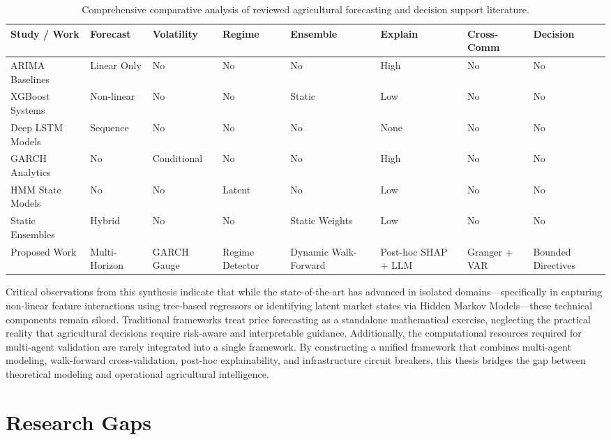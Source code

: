 \documentclass[12pt,a4paper]{report}
\theoremstyle{definition}
\theoremstyle{remark}
\begin{document}
\begin{table}[htbp]
\centering
\caption{Comprehensive comparative analysis of reviewed agricultural forecasting and decision support literature.}
\label{tab:literature_comparison}
\begin{tabular}{p{2.2cm}|p{1.4cm}|p{1.4cm}|p{1.4cm}|p{1.4cm}|p{1.4cm}|p{1.4cm}|p{1.4cm}}
\hline
\textbf{Study / Work} & \textbf{Forecast} & \textbf{Volatility} & \textbf{Regime} & \textbf{Ensemble} & \textbf{Explain} & \textbf{Cross-Comm} & \textbf{Decision} \\
\hline
ARIMA Baselines & Linear Only & No & No & No & High & No & No \\
\hline
XGBoost Systems & Non-linear & No & No & Static & Low & No & No \\
\hline
Deep LSTM Models & Sequence & No & No & No & None & No & No \\
\hline
GARCH Analytics & No & Conditional & No & No & High & No & No \\
\hline
HMM State Models & No & No & Latent & No & Low & No & No \\
\hline
Static Ensembles & Hybrid & No & No & Static Weights & Low & No & No \\
\hline
Proposed Work & Multi-Horizon & GARCH Gauge & Regime Detector & Dynamic Walk-Forward & Post-hoc SHAP + LLM & Granger + VAR & Bounded Directives \\
\hline
\end{tabular}
\end{table}

Critical observations from this synthesis indicate that while the state-of-the-art has advanced in isolated domains—specifically in capturing non-linear feature interactions using tree-based regressors or identifying latent market states via Hidden Markov Models—these technical components remain siloed. Traditional frameworks treat price forecasting as a standalone mathematical exercise, neglecting the practical reality that agricultural decisions require risk-aware and interpretable guidance. Additionally, the computational resources required for multi-agent validation are rarely integrated into a single framework. By constructing a unified framework that combines multi-agent modeling, walk-forward cross-validation, post-hoc explainability, and infrastructure circuit breakers, this thesis bridges the gap between theoretical modeling and operational agricultural intelligence.

\section{Research Gaps}
\end{document}
